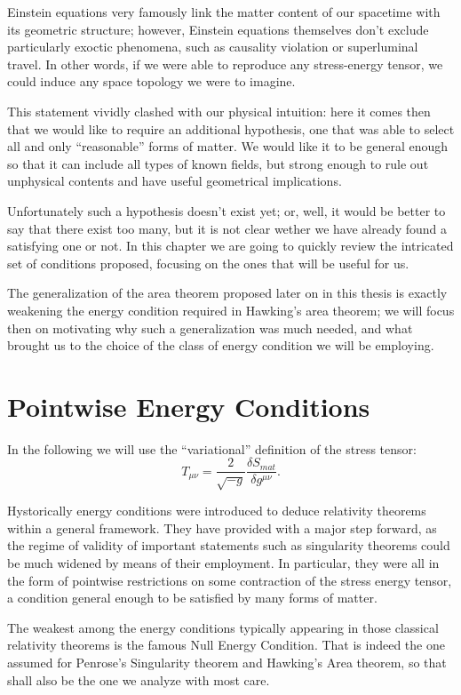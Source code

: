 Einstein equations very famously link the matter content of our spacetime with its geometric structure; however, Einstein equations themselves don't exclude particularly exoctic phenomena, such as causality violation or superluminal travel. In other words, if we were able to reproduce any stress-energy tensor, we could induce any space topology we were to imagine.

This statement vividly clashed with our physical intuition: here it comes then that we would like to require an additional hypothesis, one that was able to select all and only ``reasonable'' forms of matter. We would like it to be general enough so that it can include all types of known fields, but strong enough to rule out unphysical contents and have useful geometrical implications.

Unfortunately such a hypothesis doesn't exist yet; or, well, it would be better to say that there exist too many, but it is not clear wether we have already found a satisfying one or not. In this chapter we are going to quickly review the intricated set of conditions proposed, focusing on the ones that will be useful for us. 

The generalization of the area theorem proposed later on in this thesis is exactly weakening the energy condition required in Hawking's area theorem; we will focus then on motivating why such a generalization was much needed, and what brought us to the choice of the class of energy condition we will be employing.

\section{Pointwise Energy Conditions}
\label{sec:pointwise-energy-conditions}

In the following we will use the ``variational'' definition of the stress tensor:
\[
   T_{\mu\nu} = \frac{2}{\sqrt{-g}} \frac{\delta S_{mat}}{\delta g^{\mu\nu}}. 
\]

Hystorically energy conditions were introduced to deduce relativity theorems within a general framework. They have provided with a major step forward, as the regime of validity of important statements such as singularity theorems could be much widened by means of their employment. 
In particular, they were all in the form of pointwise restrictions on some contraction of the stress energy tensor, a condition general enough to be satisfied by many forms of matter.

The weakest among the energy conditions typically appearing in those classical relativity theorems is the famous Null Energy Condition. That is indeed the one assumed for Penrose's Singularity theorem and Hawking's Area theorem, so that shall also be the one we analyze with most care.

